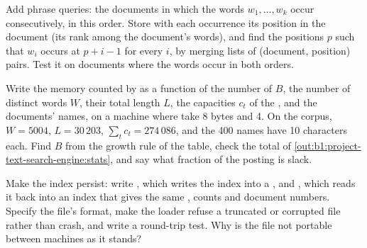\begin{exercise}[$\star\star\star$]\label{exo:b1:project-text-search-engine:10}
Add phrase queries: the documents in which the words $w_1, \dots, w_k$ occur consecutively, in this order. Store with
each occurrence its position in the document (its rank among the document's words), and find the positions $p$ such
that $w_i$ occurs at $p + i - 1$ for every $i$, by merging lists of (document, position) pairs. Test it on documents
where the words occur in both orders.
\end{exercise}

\begin{exercise}[$\star\star\star$]\label{exo:b1:project-text-search-engine:11}
Write the memory counted by  as a function of the number of  $B$, the number of distinct
words $W$, their total length $L$, the capacities $c_t$ of the , and the documents' names, on a machine
where  take 8 bytes and  4. On the corpus, $W = 5004$, $L = 30\,203$, $\sum_t c_t = 274\,086$, and the
400 names have 10 characters each. Find $B$ from the growth rule of the table, check the total of
\cref{out:b1:project-text-search-engine:stats}, and say what fraction of the posting  is slack.
\end{exercise}

\begin{exercise}[$\star\star\star$]\label{exo:b1:project-text-search-engine:12}
Make the index persist: write , which writes the index into a , and ,
which reads it back into an index that gives the same , counts and document numbers. Specify the file's
format, make the loader refuse a truncated or corrupted file rather than crash, and write a round-trip test. Why is the
file not portable between machines as it stands?
\end{exercise}
